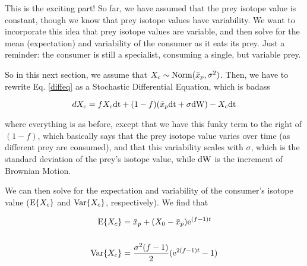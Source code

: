 \documentclass[11pt]{article}
\begin{document}
This is the exciting part! So far, we have assumed that the prey isotope value is constant, though we know that prey isotope values have variability.
We want to incorporate this idea that prey isotope values are variable, and then solve for the mean (expectation) and variability of the consumer as it eats its prey.
Just a reminder: the consumer is still a specialist, consuming a single, but variable prey.

So in this next section, we assume that $X_c \sim {\rm Norm}(\bar{x}_p,\sigma^2)$.
Then, we have to rewrite Eq. \ref{diffeq} as a Stochastic Differential Equation, which is badass

\begin{equation}
	dX_c = fX_c{\rm dt} + (1-f)(\bar{x}_p{\rm dt} + \sigma{\rm dW}) - X_c{\rm dt}
\end{equation}

\noindent where everything is as before, except that we have this funky term to the right of $(1-f)$, which basically says that the prey isotope value varies over time (as different prey are consumed), and that this variability scales with $\sigma$, which is the standard deviation of the prey's isotope value, while ${\rm dW}$ is the increment of Brownian Motion.

We can then solve for the expectation and variability of the consumer's isotope value (${\rm E}\{X_c\}$ and ${\rm Var}\{X_c\}$, respectively).
We find that

\begin{align}
	{\rm E}\{X_c\} &= \bar{x}_p + (X_0-\bar{x}_p){\rm e}^{(f-1)t} \nonumber \\ \nonumber \\ 
	{\rm Var}\{X_c\} &= \frac{\sigma^2(f-1)}{2}({\rm e}^{2(f-1)t} -1)
\end{align}
\end{document}
